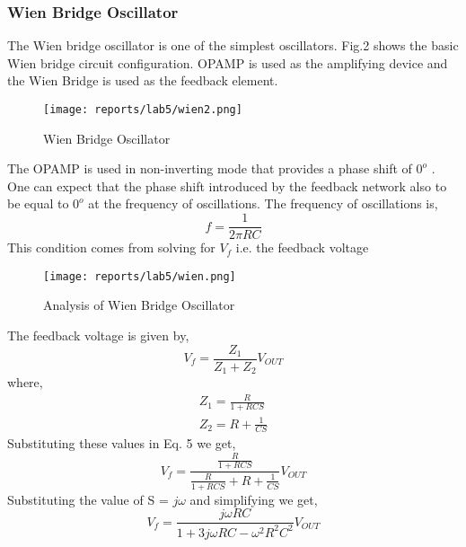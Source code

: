 \documentclass[12pt]{article}
\begin{document}
        \subsubsection{Wien Bridge Oscillator}
            The Wien bridge oscillator is one of the simplest oscillators. Fig.2 shows the basic Wien bridge circuit configuration. OPAMP is used as the amplifying device and the Wien Bridge is used as the feedback element.
            \begin{figure}[H]
                \centering
                \texttt{[image: reports/lab5/wien2.png]}
                \caption{Wien Bridge Oscillator}
                \label{fig:instru}
            \end{figure}
            \noindent
            The OPAMP is used in non-inverting mode that provides a phase shift of $0^o$ . One can expect that the phase shift introduced by the feedback network also to be equal to $0^o$ at the frequency of oscillations. The frequency of oscillations is,
            \begin{equation}
                f = \frac{1}{2\pi RC}
            \end{equation}
            \noindent
            This condition comes from solving for $V_f$ i.e. the feedback voltage
            \begin{figure}[H]
                \centering
                \texttt{[image: reports/lab5/wien.png]}
                \caption{Analysis of Wien Bridge Oscillator}
                \label{fig:instru}
            \end{figure}
            \noindent
            The feedback voltage is given by,
            \begin{equation}
                V_f = \frac{Z_1}{Z_1+Z_2}V_{OUT} 
            \end{equation}
            \noindent
            where,
            \begin{gather}
                Z_1 = \frac{R}{1+RCS}\\
                Z_2 = R + \frac{1}{CS}
            \end{gather}
            \noindent
            Substituting these values in Eq. 5 we get,
            \begin{equation}
                V_f = \frac{\frac{R}{1+RCS}}{\frac{R}{1+RCS}+R + \frac{1}{CS}}V_{OUT} 
            \end{equation}
            \noindent
            Substituting the value of S = $j\omega$ and simplifying we get,
            \begin{equation}
                V_f = \frac{j\omega RC}{1+3j\omega RC - \omega^2R^2C^2}V_{OUT}
            \end{equation}
\end{document}
